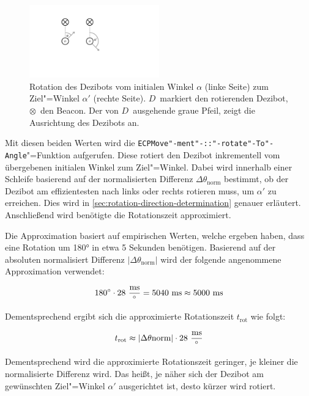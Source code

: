 \begin{figure}[h]
    \centering
    \includegraphics[width=0.5\textwidth]{../assets/dezibot_rotation_angles.pdf}
    \caption{Rotation des Dezibots vom initialen Winkel $\alpha$ (linke Seite) zum Ziel"=Winkel $\alpha'$ (rechte Seite). $D$~markiert den rotierenden Dezibot, $\otimes$~den Beacon. Der von $D$~ausgehende graue Pfeil, zeigt die Ausrichtung des Dezibots an.}
    \label{fig:dezibot-rotation-angles}
\end{figure}

Mit diesen beiden Werten wird die \texttt{ECPMove"-ment"-::"-rotate"-To"-Angle}"=Funktion aufgerufen. Diese rotiert den Dezibot inkrementell vom übergebenen initialen Winkel zum Ziel"=Winkel. Dabei wird innerhalb einer Schleife basierend auf der normalisierten Differenz $\Delta\theta_{\text{norm}}$ bestimmt, ob der Dezibot am effizientesten nach links oder rechts rotieren muss, um $\alpha'$ zu erreichen. Dies wird in \autoref{sec:rotation-direction-determination} genauer erläutert. Anschließend wird benötigte die Rotationszeit approximiert.

Die Approximation basiert auf empirischen Werten, welche ergeben haben, dass eine Rotation um 180° in etwa 5 Sekunden benötigen. Basierend auf der absoluten normalisiert Differenz $\vert\Delta\theta_{\text{norm}}\vert$ wird der folgende angenommene Approximation verwendet:

\begin{equation*}
    180^\circ \cdot 28~\frac{\text{ms}}{^\circ} = 5040~\text{ms} \approx 5000~\text{ms}
\end{equation*}

Dementsprechend ergibt sich die approximierte Rotationszeit $t_{\text{rot}}$ wie folgt:

\begin{equation*}
    t_{\text{rot}} \approx \vert\Delta\theta{\text{norm}}\vert \cdot 28~\frac{\text{ms}}{^\circ}
\end{equation*}

Dementsprechend wird die approximierte Rotationszeit geringer, je kleiner die normalisierte Differenz wird. Das heißt, je näher sich der Dezibot am gewünschten Ziel"=Winkel $\alpha'$ ausgerichtet ist, desto kürzer wird rotiert.


